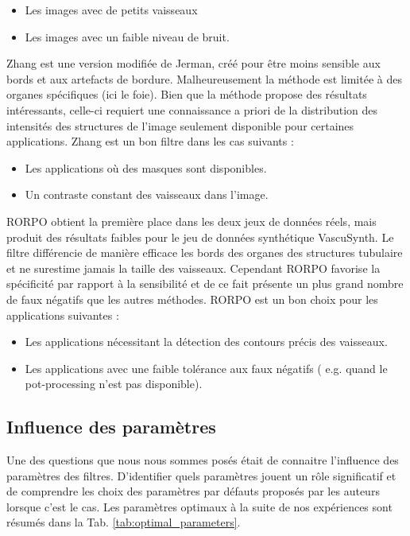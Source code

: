 \begin{itemize}
\item Les images avec de petits vaisseaux
\item Les images avec un faible niveau de bruit.
\end{itemize} 

Zhang est une version modifiée de Jerman, créé pour être moins sensible aux bords et aux artefacts de bordure. Malheureusement la méthode est limitée à des organes spécifiques (ici le  foie). Bien que la méthode propose des résultats intéressants, celle-ci requiert une connaissance a priori de la distribution des intensités des structures de l'image seulement disponible pour certaines applications. Zhang est un bon filtre dans les cas suivants :

\begin{itemize}
\item Les applications où des masques sont disponibles.
\item Un contraste constant des vaisseaux dans l'image.
\end{itemize}

RORPO obtient la première place dans les deux jeux de données réels, mais produit des résultats faibles pour le jeu de données synthétique VascuSynth. Le filtre différencie de manière efficace les bords des organes des structures tubulaire et ne surestime jamais la taille des vaisseaux. Cependant RORPO favorise la spécificité par rapport à la sensibilité et de ce fait présente un plus grand nombre de faux négatifs que les autres méthodes. RORPO est un bon choix pour les applications suivantes :

\begin{itemize}
  \item Les applications nécessitant la détection des contours précis des vaisseaux.
  \item Les applications avec une faible tolérance aux faux négatifs ( e.g. quand le pot-processing n'est pas disponible). 
\end{itemize}

\subsection{Influence des paramètres}

Une des questions que nous nous sommes posés était de connaitre l'influence des paramètres des filtres. D'identifier quels paramètres jouent un rôle significatif et de comprendre les choix des paramètres par défauts proposés par les auteurs lorsque c'est le cas. Les paramètres optimaux à la suite de nos expériences sont résumés dans la Tab. \ref{tab:optimal_parameters}.

